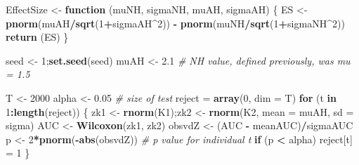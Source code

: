 \documentclass[
]{book}
\newenvironment{Shaded}{\begin{snugshade}}{\end{snugshade}}
\newcommand{\CommentTok}[1]{\textcolor[rgb]{0.56,0.35,0.01}{\textit{#1}}}
\newcommand{\ControlFlowTok}[1]{\textcolor[rgb]{0.13,0.29,0.53}{\textbf{#1}}}
\newcommand{\DataTypeTok}[1]{\textcolor[rgb]{0.13,0.29,0.53}{#1}}
\newcommand{\DecValTok}[1]{\textcolor[rgb]{0.00,0.00,0.81}{#1}}
\newcommand{\FloatTok}[1]{\textcolor[rgb]{0.00,0.00,0.81}{#1}}
\newcommand{\KeywordTok}[1]{\textcolor[rgb]{0.13,0.29,0.53}{\textbf{#1}}}
\newcommand{\NormalTok}[1]{#1}
\newcommand{\OperatorTok}[1]{\textcolor[rgb]{0.81,0.36,0.00}{\textbf{#1}}}
\newcommand{\StringTok}[1]{\textcolor[rgb]{0.31,0.60,0.02}{#1}}
\begin{document}
\begin{Shaded}
\begin{Highlighting}[]
\NormalTok{EffectSize <-}\StringTok{ }\ControlFlowTok{function}\NormalTok{ (muNH, sigmaNH, muAH, sigmaAH)}
\NormalTok{\{}
\NormalTok{  ES <-}\StringTok{ }\KeywordTok{pnorm}\NormalTok{(muAH}\OperatorTok{/}\KeywordTok{sqrt}\NormalTok{(}\DecValTok{1}\OperatorTok{+}\NormalTok{sigmaAH}\OperatorTok{^}\DecValTok{2}\NormalTok{)) }\OperatorTok{-}\StringTok{ }\KeywordTok{pnorm}\NormalTok{(muNH}\OperatorTok{/}\KeywordTok{sqrt}\NormalTok{(}\DecValTok{1}\OperatorTok{+}\NormalTok{sigmaNH}\OperatorTok{^}\DecValTok{2}\NormalTok{))}
  \KeywordTok{return}\NormalTok{ (ES)}
\NormalTok{\}}

\NormalTok{seed <-}\StringTok{ }\DecValTok{1}\NormalTok{;}\KeywordTok{set.seed}\NormalTok{(seed)}
\NormalTok{muAH <-}\StringTok{ }\FloatTok{2.1} \CommentTok{# NH value, defined previously, was mu = 1.5}

\NormalTok{T <-}\StringTok{ }\DecValTok{2000}
\NormalTok{alpha <-}\StringTok{ }\FloatTok{0.05} \CommentTok{# size of test}
\NormalTok{reject =}\StringTok{ }\KeywordTok{array}\NormalTok{(}\DecValTok{0}\NormalTok{, }\DataTypeTok{dim =}\NormalTok{ T)}
\ControlFlowTok{for}\NormalTok{ (t }\ControlFlowTok{in} \DecValTok{1}\OperatorTok{:}\KeywordTok{length}\NormalTok{(reject)) \{  }
\NormalTok{  zk1 <-}\StringTok{ }\KeywordTok{rnorm}\NormalTok{(K1);zk2 <-}\StringTok{ }\KeywordTok{rnorm}\NormalTok{(K2, }\DataTypeTok{mean =}\NormalTok{ muAH, }\DataTypeTok{sd =}\NormalTok{ sigma)  }
\NormalTok{  AUC <-}\StringTok{ }\KeywordTok{Wilcoxon}\NormalTok{(zk1, zk2)  }
\NormalTok{  obsvdZ <-}\StringTok{ }\NormalTok{(AUC }\OperatorTok{-}\StringTok{ }\NormalTok{meanAUC)}\OperatorTok{/}\NormalTok{sigmaAUC}
\NormalTok{  p <-}\StringTok{ }\DecValTok{2}\OperatorTok{*}\KeywordTok{pnorm}\NormalTok{(}\OperatorTok{-}\KeywordTok{abs}\NormalTok{(obsvdZ)) }\CommentTok{# p value for individual t}
  \ControlFlowTok{if}\NormalTok{ (p }\OperatorTok{<}\StringTok{ }\NormalTok{alpha) reject[t] =}\StringTok{ }\DecValTok{1} 
\NormalTok{\}}


\end{Highlighting}
\end{Shaded}
\end{document}
